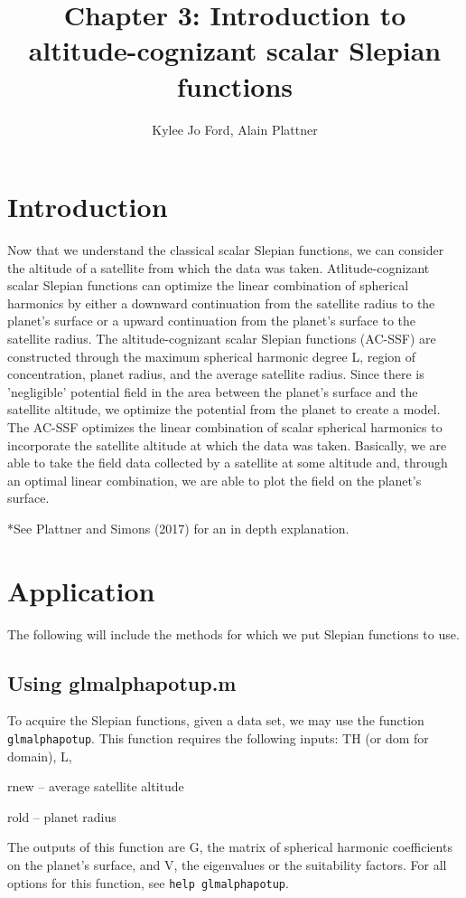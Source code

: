 \documentclass[11pt]{article}
\title{Chapter 3: Introduction to altitude-cognizant scalar Slepian functions}
\author{Kylee Jo Ford, Alain Plattner}
\begin{document}
\maketitle

\section{Introduction}

Now that we understand the classical scalar Slepian functions, we can consider the altitude of a satellite from which the data was taken.   Atlitude-cognizant scalar Slepian functions can optimize the linear combination of spherical harmonics by either a downward continuation from the satellite radius to the planet's surface or a upward continuation from the planet's surface to the satellite radius.  The altitude-cognizant scalar Slepian functions (AC-SSF) are constructed through the maximum spherical harmonic degree L, region of concentration, planet radius, and the average satellite radius.  Since there is 'negligible' potential field in the area between the planet's surface and the satellite altitude, we optimize the potential from the planet to create a model.  The AC-SSF optimizes the linear combination of scalar spherical harmonics to incorporate the satellite altitude at which the data was taken.  Basically, we are able to take the field data collected by a satellite at some altitude and, through an optimal linear combination, we are able to plot the field on the planet's surface. 

*See Plattner and Simons (2017) for an in depth explanation.

\section{Application}

The following will include the methods for which we put Slepian functions to use.  

\subsection{Using glmalphapotup.m}
To acquire the Slepian functions, given a data set, we may use the function \verb+glmalphapotup+.  This function requires the following inputs: TH (or dom for domain), L, 

rnew -- average satellite altitude

rold -- planet radius

The outputs of this function are G, the matrix of spherical harmonic coefficients on the planet's surface, and V, the eigenvalues or the suitability factors. For all options for this function, see \verb+help glmalphapotup+.  
\end{document}
